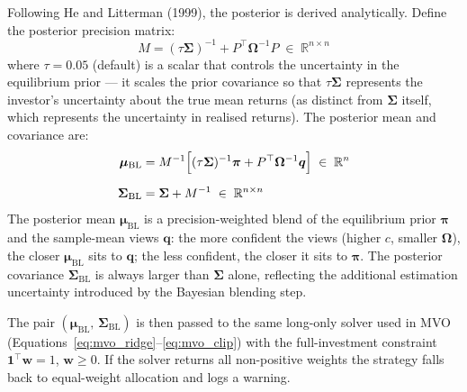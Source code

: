\documentclass[11pt, a4paper]{article}
\newcommand{\BL}{\mathrm{BL}}
\begin{document}
Following He and Litterman (1999), the posterior is derived analytically.
Define the posterior precision matrix:
\begin{equation}
  M = (\tau\bm{\Sigma})^{-1} + P^{\top}\bm{\Omega}^{-1}P
  \;\in\; \mathbb{R}^{n \times n}
  \label{eq:M}
\end{equation}
where $\tau = 0.05$ (default) is a scalar that controls the uncertainty in
the equilibrium prior --- it scales the prior covariance so that
$\tau\bm{\Sigma}$ represents the investor's uncertainty about the true mean
returns (as distinct from $\bm{\Sigma}$ itself, which represents the
uncertainty in realised returns). The posterior mean and covariance are:
\begin{align}
  \bm{\mu}_{\BL} &= M^{-1}\Bigl[
    (\tau\bm{\Sigma})^{-1}\bm{\pi} + P^{\top}\bm{\Omega}^{-1}\bm{q}
  \Bigr]
  \;\in\; \mathbb{R}^{n}
  \label{eq:muBL} \\[6pt]
  \bm{\Sigma}_{\BL} &= \bm{\Sigma} + M^{-1}
  \;\in\; \mathbb{R}^{n \times n}
  \label{eq:SigmaBL}
\end{align}
The posterior mean $\bm{\mu}_{\BL}$ is a precision-weighted blend of the
equilibrium prior $\bm{\pi}$ and the sample-mean views $\bm{q}$: the more
confident the views (higher $c$, smaller $\bm{\Omega}$), the closer
$\bm{\mu}_{\BL}$ sits to $\bm{q}$; the less confident, the closer it sits to
$\bm{\pi}$. The posterior covariance $\bm{\Sigma}_{\BL}$ is always larger
than $\bm{\Sigma}$ alone, reflecting the additional estimation uncertainty
introduced by the Bayesian blending step.

The pair $(\bm{\mu}_{\BL},\,\bm{\Sigma}_{\BL})$ is then passed to the same
long-only solver used in MVO (Equations~\ref{eq:mvo_ridge}--\ref{eq:mvo_clip})
with the full-investment constraint $\mathbf{1}^{\top}\bm{w} = 1$,
$\bm{w} \geq 0$. If the solver returns all non-positive weights the strategy
falls back to equal-weight allocation and logs a warning.
\end{document}
